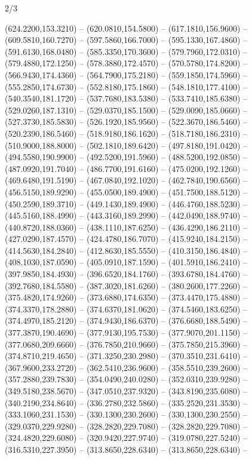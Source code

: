 \begin{flagdescription}{2/3}
\begin{scope}[xshift=0.5\flaglength]
\begin{scope}[scale=0.00209\flagwidth,yshift=170mm,xshift=-360]
\begin{scope}[y=-0.8pt, x=0.8pt, inner sep=0pt, outer sep=0pt]
  (624.2200,153.3210) -- (620.0810,154.5800) -- (617.1810,156.9600) --
  (609.5810,160.7270) -- (597.5860,166.7000) -- (595.1330,167.4860) --
  (591.6130,168.0480) -- (585.3350,170.3600) -- (579.7960,172.0310) --
  (579.4880,172.1250) -- (578.3880,172.4570) -- (570.5780,174.8200) --
  (566.9430,174.4360) -- (564.7900,175.2180) -- (559.1850,174.5960) --
  (555.2850,174.6730) -- (552.8180,175.1860) -- (548.1810,177.4100) --
  (540.3540,181.1720) -- (537.7680,183.5380) -- (533.7410,185.6380) --
  (529.0260,187.1310) -- (529.0370,185.1500) -- (529.0090,185.0660) --
  (527.3730,185.5830) -- (526.1920,185.9560) -- (522.3670,186.5460) --
  (520.2390,186.5460) -- (518.9180,186.1620) -- (518.7180,186.2310) --
  (510.9000,188.8000) -- (502.1810,189.6420) -- (497.8180,191.0420) --
  (494.5580,190.9900) -- (492.5200,191.5960) -- (488.5200,192.0850) --
  (487.0920,191.7040) -- (486.7700,191.6160) -- (475.0200,192.1260) --
  (469.6480,191.5190) -- (467.0840,192.1020) -- (462.7840,190.6560) --
  (456.5150,189.9290) -- (455.0500,189.4900) -- (451.7500,188.5120) --
  (450.2590,189.3710) -- (449.1430,189.4900) -- (446.4760,188.5230) --
  (445.5160,188.4990) -- (443.3160,189.2990) -- (442.0490,188.9740) --
  (440.8720,188.0360) -- (438.1110,187.6250) -- (436.4290,186.2110) --
  (427.0290,187.4570) -- (424.4780,186.7070) -- (415.9240,184.2150) --
  (414.5630,184.2840) -- (412.8630,185.5550) -- (410.3150,186.4840) --
  (408.1030,187.0590) -- (405.0910,187.1590) -- (401.5910,186.2410) --
  (397.9850,184.4930) -- (396.6520,184.1760) -- (393.6780,184.4760) --
  (392.7680,184.5580) -- (387.3020,181.6260) -- (380.2600,177.2260) --
  (375.4820,174.9260) -- (373.6880,174.6350) -- (373.4470,175.4880) --
  (374.3370,178.2880) -- (374.6370,181.0620) -- (374.5460,183.6250) --
  (374.4970,185.2120) -- (374.9430,186.6370) -- (376.6680,188.5490) --
  (377.3870,190.4690) -- (377.9130,195.7530) -- (377.9070,201.1150) --
  (377.0680,209.6660) -- (376.7850,210.9660) -- (375.7850,215.3960) --
  (374.8710,219.4650) -- (371.3250,230.2980) -- (370.3510,231.6410) --
  (367.9600,233.2720) -- (362.5410,236.9600) -- (358.5510,239.2600) --
  (357.2880,239.7830) -- (354.0490,240.0280) -- (352.0310,239.9280) --
  (349.5180,238.5670) -- (347.0510,237.9320) -- (343.8190,235.6080) --
  (340.2190,234.8640) -- (336.2780,232.5860) -- (335.2520,231.3530) --
  (333.1060,231.1530) -- (330.1300,230.2600) -- (330.1300,230.2550) --
  (329.0370,229.9280) -- (328.2820,229.7080) -- (328.2820,229.7080) --
  (324.4820,229.6080) -- (320.9420,227.9740) -- (319.0780,227.5240) --
  (316.5310,227.3950) -- (313.8650,228.6340) -- (313.8650,228.6340) --

\end{scope}
\end{scope}
\end{scope}
\end{flagdescription}
